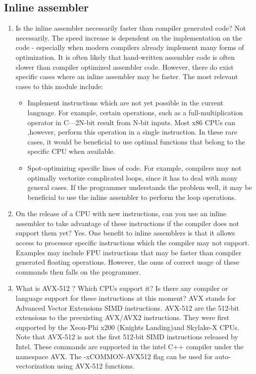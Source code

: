 \documentclass{article}
\begin{document}
\subsection{Inline assembler}
\begin{enumerate}
\item{Is the inline assembler necessarily faster than compiler generated code?}
Not necessarily. The speed increase is dependent on the implementation on the code - especially when modern compilers already implement many forms of optimization. It is often likely that hand-written assembler code is often slower than compiler optimized assembler code. However, there do exist specific cases where an inline assembler may be faster. The most relevant cases to this module include:
\begin{itemize}
\item{Implement instructions which are not yet possible in the current language. For example, certain operations, such as a full-multiplication operator in C---2N-bit result from N-bit inputs. Most x86 CPUs can ,however, perform this operation in a single instruction. In these rare cases, it would be beneficial to use optimal functions that belong to the specific CPU when available.}
\item{Spot-optimizing specific lines of code. For example, compilers may not optimally vectorize complicated loops, since it has to deal with many general cases. If the programmer understands the problem well, it may be beneficial to use the inline assembler to perform the loop operations.}
\end{itemize}
\item{On the release of a CPU with new instructions, can you use an inline assembler to take advantage of these instructions if the compiler does not support them yet?}
Yes. One benefit to inline assemblers is that it allows access to processor specific instructions which the compiler may not support. Examples may include FPU instructions that may be faster than compiler generated floating operations. However, the onus of correct usage of these commands then falls on the programmer.
\item{What is AVX-512 ? Which CPUs support it? Is there any compiler or language support for these instructions at this moment?}
AVX stands for Advanced Vector Extensions SIMD instructions. AVX-512 are the 512-bit extensions to the preexisting AVX/AVX2 instructions. They were first supported by the Xeon-Phi x200 (Knights Landing)and Skylake-X CPUs. Note that AVX-512 is not the first 512-bit SIMD instructions released by Intel. These commands are supported in the intel C++ compiler under the namespace AVX. The -xCOMMON-AVX512 flag can be used for auto-vectorization using AVX-512 functions.

\end{enumerate}
\end{document}
